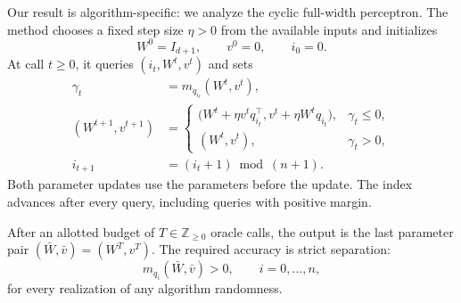 \documentclass[10pt]{article}
\theoremstyle{definition}
\begin{document}
Our result is algorithm-specific: we analyze the cyclic full-width perceptron. The method chooses a fixed step size $\eta>0$ from the available inputs and initializes
\[
W^0=I_{d+1},\qquad v^0=0,\qquad i_0=0.
\]
At call $t\geq 0$, it queries $(i_t,W^t,v^t)$ and sets
\[
\begin{aligned}
\gamma_t&=m_{q_{i_t}}(W^t,v^t),\\
(W^{t+1},v^{t+1})
&=\begin{cases}
\bigl(W^t+\eta v^tq_{i_t}^\top,
      v^t+\eta W^tq_{i_t}\bigr),&\gamma_t\leq 0,\\
(W^t,v^t),&\gamma_t>0,
\end{cases}\\
i_{t+1}&=(i_t+1)\bmod(n+1).
\end{aligned}
\]
Both parameter updates use the parameters before the update. The index advances after every query, including queries with positive margin.

After an allotted budget of $T\in\mathbb{Z}_{\geq 0}$ oracle calls, the output is the last parameter pair $(\bar W,\bar v)=(W^T,v^T)$. The required accuracy is strict separation:
\[
m_{q_i}(\bar W,\bar v)>0,
\qquad i=0,\ldots,n,
\]
for every realization of any algorithm randomness.
\end{document}

